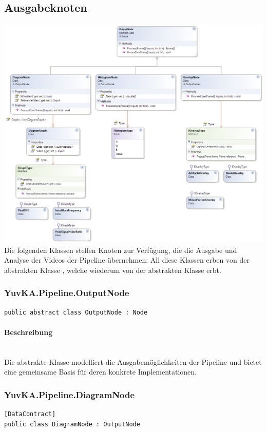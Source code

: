 \subsection{Ausgabeknoten}

\includegraphics[width=\textwidth]{YuvKA.Pipeline/outputnodes.png}
Die folgenden Klassen stellen Knoten zur Verfügung, die die Ausgabe und Analyse der Videos der Pipeline übernehmen. All diese Klassen erben von der abstrakten Klasse , welche wiederum von der abstrakten Klasse  erbt.

\subsubsection{YuvKA.Pipeline.OutputNode}

\begin{verbatim}
public abstract class OutputNode : Node
\end{verbatim}

\paragraph{Beschreibung}~\\
Die abstrakte Klasse  modelliert die Ausgabemöglichkeiten der Pipeline und bietet eine gemeinsame Basis für deren konkrete Implementationen.

\subsubsection{YuvKA.Pipeline.DiagramNode}
\begin{verbatim}
[DataContract]
public class DiagramNode : OutputNode
\end{verbatim}

